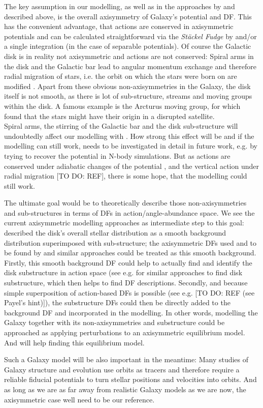 The key assumption in our modelling, as well as in the approaches by \citet{2014MNRAS.445.3133P} and \citet{2015MNRAS.449.3479S} described above, is the overall axisymmetry of Galaxy's potential and DF. This has the convenient advantage, that actions are conserved in axisymmetric potentials and can be calculated straightforward via the \emph{St\"{a}ckel Fudge} by \citet{2012MNRAS.426.1324B} and/or a single integration (in the case of separable potentials). Of course the Galactic disk is in reality not axisymmetric and actions are not conserved: Spiral arms in the disk and the Galactic bar lead to angular momentum exchange and therefore radial migration of stars, i.e. the orbit on which the stars were born on are modified \citep{2011A&A...527A.147M,2014MNRAS.443.2757K}. Apart from these obvious non-axisymmetries in the Galaxy, the disk itself is not smooth, as there is lot of sub-structure, streams and moving groups within the disk. A famous example is the Arcturus moving group, for which \citet{2004ApJ...601L..43N} found that the stars might have their origin in a disrupted satellite.
\\Spiral arms, the stirring of the Galactic bar and the disk sub-structure will undoubtedly affect our modelling with \RM{}. How strong this effect will be and if the modelling can still work, needs to be investigated in detail in future work, e.g. by trying to recover the potential in N-body simulations. But as actions are conserved under adiabatic changes of the potential \citet{2008gady.book.....B}, and the vertical action under radial migration [TO DO: REF], there is some hope, that the modelling could still work.

The ultimate goal would be to theoretically describe those non-axisymmetries and sub-structures in terms of DFs in action/angle-abundance space. We see the current axisymmetric modelling approaches as intermediate step to this goal: \citet{1998AJ....115.2384D} described the disk's overall stellar distribution as a smooth background distribution superimposed with sub-structure; the axisymmetric DFs used and to be found by \RM{} and similar approaches could be treated as this smooth background. Firstly, this smooth background DF could help to actually find and identify the disk substructure in action space (see e.g. \citet{2010MNRAS.409..145S,2008ApJ...685..261K} for similar approaches to find disk substructure, which then helps to find DF descriptions. Secondly, and because simple superposition of action-based DFs is possible (see e.g. [TO DO: REF (see Payel's hint)]), the substructure DFs could then be directly added to the background DF and incorporated in the modelling. In other words, modelling the Galaxy together with its non-axisymmetries and substructure could be approached as applying perturbations to an axisymmetric equilibrium model. And \RM{} will help finding this equilibrium model.

Such a Galaxy model will be also important in the meantime: Many studies of Galaxy structure and evolution use orbits as tracers and therefore require a reliable fiducial potentials to turn stellar positions and velocities into orbits. And as long as we are as far away from realistic Galaxy models as we are now, the axisymmetric case well need to be our reference.